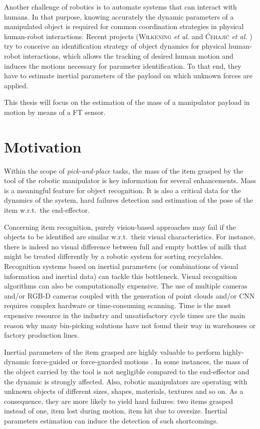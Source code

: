 \documentclass[/home/francois/latex/report/main.tex]{subfiles}
\begin{document}
Another challenge of robotics is to automate systems that can interact with humans. In that purpose, knowing accurately the dynamic parameters of a manipulated object is required for common coordination strategies in physical human-robot interactions. Recent projects (\textsc{Wilkening} \textit{et al.} \cite{Wilkening2016} and \textsc{Ćehajić} \textit{et al.} \cite{Ćehajić2017}) try to conceive an identification strategy of object dynamics for physical human-robot interactions, which allows the tracking of desired human motion and induces the motions necessary for parameter identification. To that end, they have to estimate inertial parameters of the payload on which unknown forces are applied.

This thesis will focus on the estimation of the mass of a manipulator payload in motion by means of a \ac{FT} sensor.

\section{Motivation}

Within the scope of \textit{pick-and-place} tasks, the mass of the item grasped by the tool of the robotic manipulator is key information for several enhancements. Mass is a meaningful feature for object recognition. It is also a critical data for the dynamics of the system, hard failures detection and estimation of the pose of the item w.r.t.\ the end-effector.

Concerning item recognition, purely vision-based approaches may fail if the objects to be identified are similar w.r.t.\ their visual characteristics. For instance, there is indeed no visual difference between full and empty bottles of milk that might be treated differently by a robotic system for sorting recyclables. Recognition systems based on inertial parameters (or combinations of visual information and inertial data) can tackle this bottleneck.
Visual recognition algorithms can also be computationally expensive. The use of multiple cameras and/or RGB-D cameras coupled with the generation of point clouds and/or \ac{CNN} requires complex hardware or time-consuming scanning. Time is the most expensive resource in the industry and unsatisfactory cycle times are the main reason why many bin-picking solutions have not found their way in warehouses or factory production lines.

Inertial parameters of the item grasped are highly valuable to perform highly-dynamic force-guided or force-guarded motions \cite{Garcia2006, KubusKroger2008}. In some instances, the mass of the object carried by the tool is not negligible compared to the end-effector and the dynamic is strongly affected.
Also, robotic manipulators are operating with unknown objects of different sizes, shapes, materials, textures and so on. As a consequence, they are more likely to yield hard failures: two items grasped instead of one, item lost during motion, item hit due to oversize. Inertial parameters estimation can induce the detection of such shortcomings.
\end{document}
